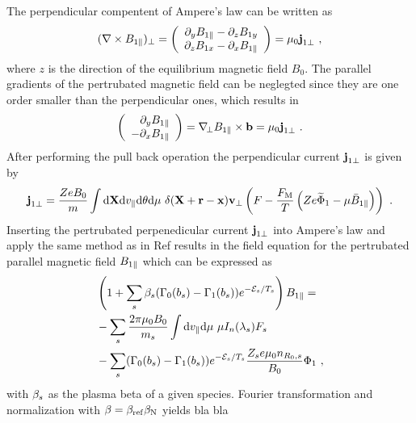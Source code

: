 The perpendicular compentent of Ampere's law can be written as 
\begin{gather}
	(\nabla \times B_{1\parallel})_\perp = \left( \begin{array}{c} \partial_y B_{1\parallel} - \partial_z B_{1 y} \\ \partial_z B_{1x} - \partial_x B_{1\parallel} \end{array} \right) = \mu_0 \boldsymbol{\mathbf{j}}_{1 \perp}~,
	\label{eq:perpendicularAmpereLawLocal}
\end{gather}
where $z$ is the direction of the equilibrium magnetic field $B_0$. The parallel gradients of the pertrubated magnetic field can be neglegted since they are one order smaller than the perpendicular ones, which results in
\begin{gather}
	\left( \begin{array}{r} \partial_y B_{1\parallel} \\ - \partial_x B_{1\parallel} \end{array} \right) = \nabla_{\!\perp} B_{1\parallel} \times \boldsymbol{\mathbf{b}} = \mu_0 \boldsymbol{\mathbf{j}}_{1 \perp}~.
\end{gather}
After performing the pull back operation the perpendicular current $\boldsymbol{\mathbf{j}}_{1\perp}$ is given by 
\begin{gather}
		\boldsymbol{\mathbf{j}}_{1\perp} = \frac{Ze B_0}{m} \int \mathrm{d}\boldsymbol{\mathbf{X}}\mathrm{d}v_\parallel\mathrm{d}\theta\mathrm{d}\mu ~ \delta(\boldsymbol{\mathbf{X}} + \boldsymbol{\mathbf{r}} - \boldsymbol{\mathbf{x}}) \boldsymbol{\mathbf{v}}_\perp \left(F - \frac{F_\mathrm{M}}{T}\left(Ze \widetilde{\Phi}_1 - \mu \bar{B}_{1\parallel}\right) \right) ~.
	\label{eq:perpendicularCurrentPullbackLocal}
\end{gather}
Inserting the pertrubated perpenedicular current $\boldsymbol{\mathbf{j}}_{1 \perp}$ into Ampere's law and apply the same method as in Ref  results in the field equation for the pertrubated parallel magnetic field $B_{1\parallel}$ which can be expressed as
\begin{gather}
    \begin{aligned}
        &\left(1 + \sum_s \beta_s (\Gamma_0(b_s) - \Gamma_1(b_s)) e^{-\mathcal{E}_s/T_s}\right) B_{1\parallel} = \\
	    &- \sum_s \frac{2\pi \mu_0 B_0}{m_s} \int \mathrm{d}v_\parallel\mathrm{d}\mu ~ \mu I_n(\lambda_s) F_s  \\
        &- \sum_s (\Gamma_0(b_s) - \Gamma_1(b_s))e^{-\mathcal{E}_s/T_s} \frac{Z_se \mu_0 n_{R_0,s}}{B_0} \Phi_1 ~,
    \end{aligned}
    \label{eq:fieldMagneticLocal}
\end{gather}
with $\beta_s$ as the plasma beta of a given species. Fourier transformation and normalization with $\beta = \beta_\mathrm{ref} \beta_\mathrm{N}$ yields bla bla 
